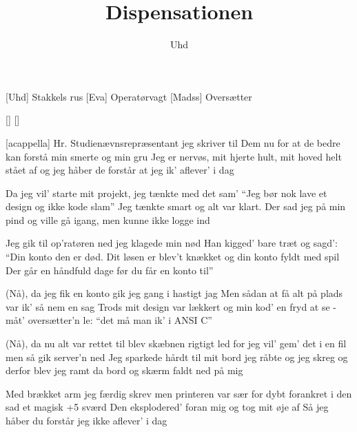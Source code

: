 \documentclass[a4paper,11pt]{article}
\title{Dispensationen}
\author{Uhd}
\begin{document}
\maketitle

\begin{roles}
[Uhd] Stakkels rus
[Eva] Operatørvagt
[Madss] Oversætter
\end{roles}

\begin{props}
[]
[]
\end{props}

  
\begin{song}

[acappella] Hr. Studienævnsrepræsentant
jeg skriver til Dem nu
for at de bedre kan forstå
min smerte og min gru
Jeg er nervøs, mit hjerte hult, 
mit hoved helt stået af
og jeg håber de forstår 
at jeg ik' aflever' i dag

Da jeg vil' starte mit projekt,
jeg tænkte med det sam'
``Jeg bør nok lave et design
og ikke kode slam''
Jeg tænkte smart og alt var klart. 
Der sad jeg på min pind
og ville gå igang, 
men kunne ikke logge ind

Jeg gik til op'ratøren ned
jeg klagede min nød
Han kigged' bare træt og sagd':
``Din konto den er død.
Dit løsen er blev't knækket og
din konto fyldt med spil
Der går en håndfuld dage før
du får en konto til''

(Nå), da jeg fik en konto
gik jeg gang i hastigt jag
Men sådan at få alt på plads
var ik' så nem en sag
Trods mit design var lækkert og 
min kod' en fryd at se
- måt' oversætter'n le: 
``det må man ik' i ANSI C''

(Nå), da nu alt var rettet til
blev skæbnen rigtigt led
for jeg vil' gem' det i en fil
men så gik server'n ned
Jeg sparkede hårdt til mit bord
jeg råbte og jeg skreg
og derfor blev jeg ramt
da bord og skærm faldt ned på mig

Med brækket arm jeg færdig skrev
men printeren var sær
for dybt forankret i den
sad et magisk +5 sværd
Den eksplodered' foran mig
og tog mit øje af
Så jeg håber du forstår
jeg ikke aflever' i dag     


\end{song}
\end{document}
